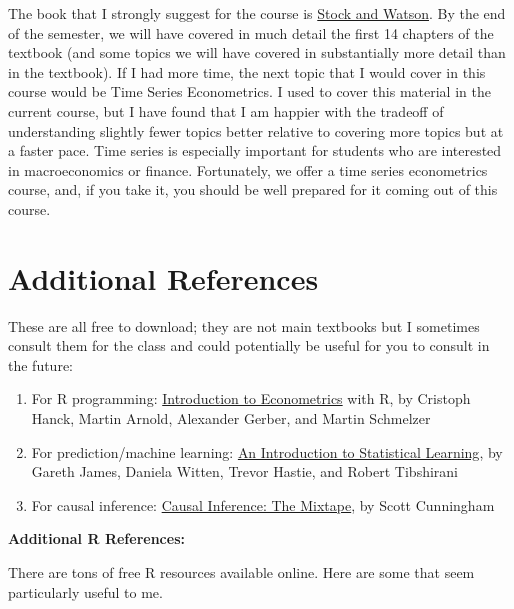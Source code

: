 \documentclass[
  letterpaper,
  DIV=11,
  numbers=noendperiod]{scrreprt}
\begin{document}
The book that I strongly suggest for the course is
\href{https://www.amazon.com/Introduction-Econometrics-4th-Pearson-Economics/dp/0134461991/ref=sr_1_1?dchild=1&keywords=stock+and+watson&qid=1618424276&s=books&sr=1-1}{Stock
and Watson}. By the end of the semester, we will have covered in much
detail the first 14 chapters of the textbook (and some topics we will
have covered in substantially more detail than in the textbook). If I
had more time, the next topic that I would cover in this course would be
Time Series Econometrics. I used to cover this material in the current
course, but I have found that I am happier with the tradeoff of
understanding slightly fewer topics better relative to covering more
topics but at a faster pace. Time series is especially important for
students who are interested in macroeconomics or finance. Fortunately,
we offer a time series econometrics course, and, if you take it, you
should be well prepared for it coming out of this course.

\section{Additional References}\label{additional-references}

These are all free to download; they are not main textbooks but I
sometimes consult them for the class and could potentially be useful for
you to consult in the future:

\begin{enumerate}
\def\labelenumi{\arabic{enumi}.}
\item
  For R programming:
  \href{https://www.econometrics-with-r.org/}{Introduction to
  Econometrics} with R, by Cristoph Hanck, Martin Arnold, Alexander
  Gerber, and Martin Schmelzer
\item
  For prediction/machine learning:
  \href{https://faculty.marshall.usc.edu/gareth-james/ISL/}{An
  Introduction to Statistical Learning}, by Gareth James, Daniela
  Witten, Trevor Hastie, and Robert Tibshirani
\item
  For causal inference: \href{http://scunning.com/mixtape.html}{Causal
  Inference: The Mixtape}, by Scott Cunningham
\end{enumerate}

\textbf{Additional R References:}

There are tons of free R resources available online. Here are some that
seem particularly useful to me.
\end{document}
